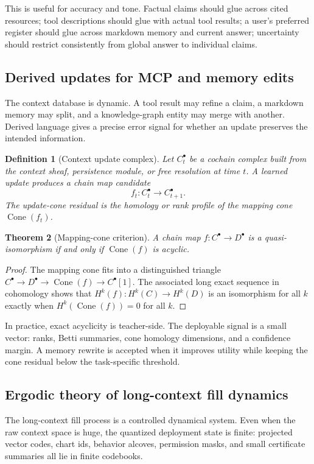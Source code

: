 \documentclass[11pt]{article}
\newtheorem{theorem}{Theorem}[section]
\newtheorem{definition}[theorem]{Definition}
\numberwithin{equation}{section}
\begin{document}
This is useful for accuracy and tone. Factual claims should glue across cited resources; tool descriptions should glue with actual tool results; a user's preferred register should glue across markdown memory and current answer; uncertainty should restrict consistently from global answer to individual claims.

\subsection{Derived updates for MCP and memory edits}
The context database is dynamic. A tool result may refine a claim, a markdown memory may split, and a knowledge-graph entity may merge with another. Derived language gives a precise error signal for whether an update preserves the intended information.

\begin{definition}[Context update complex]
Let $C_t^\bullet$ be a cochain complex built from the context sheaf, persistence module, or free resolution at time $t$. A learned update produces a chain map candidate
\begin{equation}
f_t:C_t^\bullet\to C_{t+1}^\bullet.
\end{equation}
The update-cone residual is the homology or rank profile of the mapping cone $\operatorname{Cone}(f_t)$.
\end{definition}

\begin{theorem}[Mapping-cone criterion]
A chain map $f:C^\bullet\to D^\bullet$ is a quasi-isomorphism if and only if $\operatorname{Cone}(f)$ is acyclic.
\end{theorem}
\begin{proof}
The mapping cone fits into a distinguished triangle $C^\bullet\to D^\bullet\to \operatorname{Cone}(f)\to C^\bullet[1]$. The associated long exact sequence in cohomology shows that $H^k(f):H^k(C)\to H^k(D)$ is an isomorphism for all $k$ exactly when $H^k(\operatorname{Cone}(f))=0$ for all $k$.
\end{proof}

In practice, exact acyclicity is teacher-side. The deployable signal is a small vector: ranks, Betti summaries, cone homology dimensions, and a confidence margin. A memory rewrite is accepted when it improves utility while keeping the cone residual below the task-specific threshold.

\subsection{Ergodic theory of long-context fill dynamics}
The long-context fill process is a controlled dynamical system. Even when the raw context space is huge, the quantized deployment state is finite: projected vector codes, chart ids, behavior alcoves, permission masks, and small certificate summaries all lie in finite codebooks.
\end{document}
